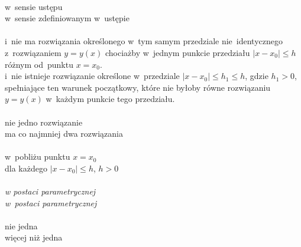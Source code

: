\documentclass[a4paper,11pt]{article}
\numberwithin{equation}{section}
\begin{document}
\VerSpaceSix


\noindent
{} \\
\Jest  w~sensie ustępu \\
\Powin w~sensie zdefiniowanym w~ustępie \\
 \\
\Jest  i~nie ma rozwiązania określonego w~tym samym przedziale
nie~identycznego z~rozwiązaniem $y = y( x )$ chociażby w~jednym
punkcie przedziału $| x - x_{ 0 } | \leq h$ różnym od~punktu $x = x_{ 0 }$. \\
\Powin i~nie istnieje rozwiązanie określone w~przedziale
$| x - x_{ 0 } | \leq h_{ 1 } \leq h$, gdzie $h_{ 1 } > 0$, spełniające ten warunek
początkowy, które nie byłoby równe rozwiązaniu $y = y( x )$ w~każdym
punkcie tego przedziału. \\
 \\
\Jest  nie jedno rozwiązanie \\
\Powin ma co najmniej dwa rozwiązania \\
 \\
\Jest  w~pobliżu punktu $x = x_{ 0 }$ \\
\Powin dla każdego $| x - x_{ 0 } | \leq h$, $h > 0$ \\
 \\
\Jest  \textit{w \hspace{0.5em} postaci \hspace{0.5em} parametrycznej} \\
\Powin \textit{w~postaci parametrycznej} \\
 \\
\Jest  nie jedna \\
\Powin więcej niż jedna \\











{}






\end{document}
